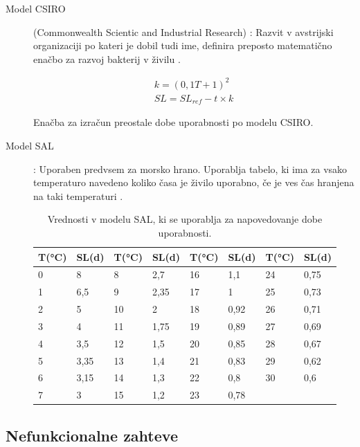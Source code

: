 \documentclass[a4paper, 12pt]{book}
\begin{document}
\begin{description}

	\item[Model CSIRO] (Commonwealth Scientic and Industrial Research) : Razvit v avstrijski organizaciji po kateri je dobil tudi ime, definira preposto matematično enačbo za razvoj bakterij v živilu \cite{CSIRO-organizacija}.
	
	\begin{align}
		k = (0,1T + 1)^2				\\
       	SL = SL_{ref} - t \times k
	\end{align}
	
	Enačba za izračun preostale dobe uporabnosti po modelu CSIRO.
	
	\item[Model SAL] : Uporaben predvsem za morsko hrano. Uporablja tabelo, ki ima za vsako temperaturo navedeno koliko časa je živilo uporabno, če je ves čas hranjena na taki temperaturi \cite{magistrska-marolt}. 

\begin{table}[h]
\begin{center}
\begin{tabular}{ll|ll|ll|ll}
T(°C) & SL(d) & T(°C) & SL(d) & T(°C) & SL(d) & T(°C) & SL(d) \\ \hline
0     & 8     & 8     & 2,7   & 16    & 1,1   & 24    & 0,75  \\
1     & 6,5   & 9     & 2,35  & 17    & 1     & 25    & 0,73  \\
2     & 5     & 10    & 2     & 18    & 0,92  & 26    & 0,71  \\
3     & 4     & 11    & 1,75  & 19    & 0,89  & 27    & 0,69  \\
4     & 3,5   & 12    & 1,5   & 20    & 0,85  & 28    & 0,67  \\
5     & 3,35  & 13    & 1,4   & 21    & 0,83  & 29    & 0,62  \\
6     & 3,15  & 14    & 1,3   & 22    & 0,8   & 30    & 0,6   \\
7     & 3     & 15    & 1,2   & 23    & 0,78  &       &      
\end{tabular}
\caption{Vrednosti v modelu SAL, ki se uporablja za napovedovanje dobe uporabnosti.}
\label{tab:tabela-sal}
\end{center}
\end{table}
	
\end{description}



\subsection{Nefunkcionalne zahteve}
\end{document}

